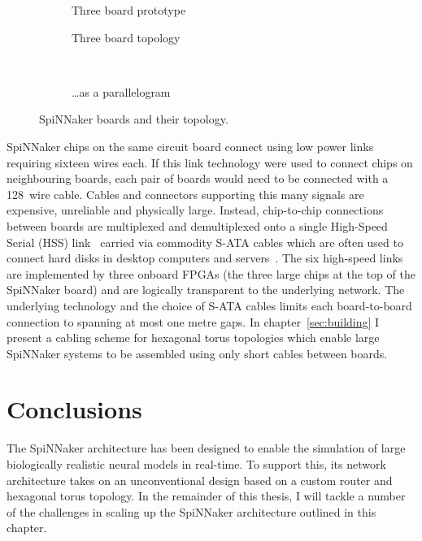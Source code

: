 \begin{figure}
\begin{subfigure}[b]{0.45\linewidth}
				\caption{Three board prototype}
				\label{fig:threeboard}
			\end{subfigure}
			
			\vspace*{1em}
			
			\begin{subfigure}[b]{0.45\linewidth}
				\center
				
				\caption{Three board topology}
				\label{fig:threeboard-separate}
			\end{subfigure}
			~~~
			\begin{subfigure}[b]{0.45\linewidth}
				\center
				
				\caption{\ldots{}as a parallelogram}
				\label{fig:threeboard-wrapped}
			\end{subfigure}
			
			\caption{SpiNNaker boards and their topology.}
			\label{fig:spinnaker-boards}
		\end{figure}
		
		
		SpiNNaker chips on the same circuit board connect using low power links
		requiring sixteen wires each.  If this link technology were used to connect
		chips on neighbouring boards, each pair of boards would need to be
		connected with a 128~wire cable.  Cables and connectors supporting this
		many signals are expensive, unreliable and physically large. Instead,
		chip-to-chip connections between boards are multiplexed and demultiplexed
		onto a single High-Speed Serial (HSS) link~\cite{athavale05} carried via
		commodity S-ATA cables which are often used to connect hard disks in
		desktop computers and servers~\cite{sata3spec}. The six high-speed links
		are implemented by three onboard FPGAs (the three large chips at the top of
		the SpiNNaker board) and are logically transparent to the underlying
		network. The underlying technology and the choice of S-ATA cables limits
		each board-to-board connection to spanning at most one metre gaps. In
		chapter~\ref{sec:building} I present a cabling scheme for hexagonal torus
		topologies which enable large SpiNNaker systems to be assembled using only
		short cables between boards.
		
	\section{Conclusions}
		
		The SpiNNaker architecture has been designed to enable the simulation of
		large biologically realistic neural models in real-time. To support this,
		its network architecture takes on an unconventional design based on a
		custom router and hexagonal torus topology. In the remainder of this
		thesis, I will tackle a number of the challenges in scaling up the
		SpiNNaker architecture outlined in this chapter.
